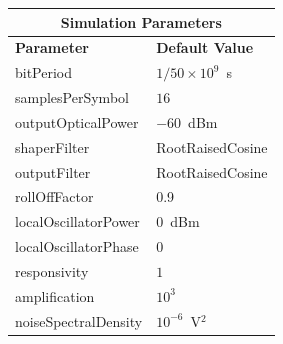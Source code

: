 \begin{table}[H]
	\centering
	\footnotesize
	\begin{tabular}{|l|l|}
		\hline
		\multicolumn{2}{|c|}{ \textbf{Simulation Parameters} } \\
		\hline
		\textbf{Parameter}     & \textbf{Default Value}                                     \\\hline
		bitPeriod              & $1/50\times10^9$~s														\\\hline
		samplesPerSymbol       & $16$                                                       \\\hline
		outputOpticalPower     & $-60$~dBm 													\\ \hline
		shaperFilter	       & RootRaisedCosine												\\ \hline
		outputFilter		   & RootRaisedCosine												\\ \hline
		rollOffFactor		   & 0.9														\\ \hline
		localOscillatorPower   & $0$~dBm                                                    \\ \hline
		localOscillatorPhase   & $0$                                                        \\ \hline
		responsivity           & $1$                                                        \\ \hline
		amplification          & $10^3$                                                     \\ \hline
		noiseSpectralDensity   & $10^{-6}$~V$^2$                             					\\ \hline
	\end{tabular}
\end{table}
